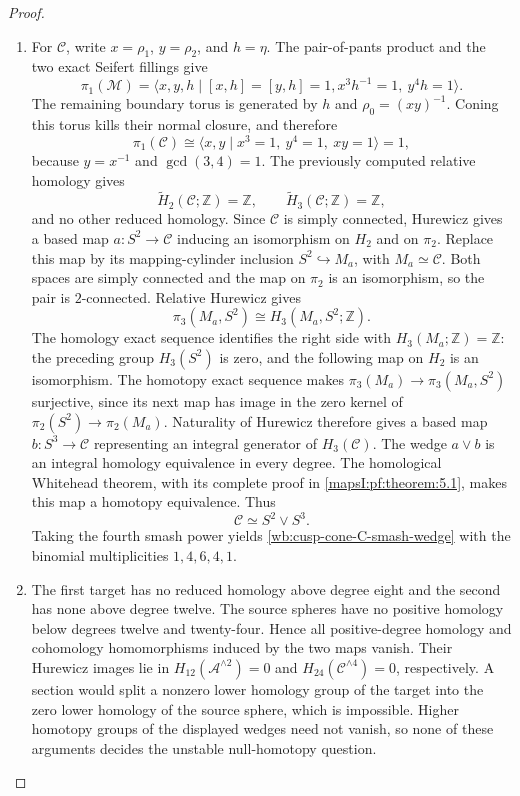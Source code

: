 \begin{proof}
\begin{enumerate}[label=\arabic*.,leftmargin=*]
\item For \(\mathcal C\), write \(x=\rho_1\), \(y=\rho_2\), and
\(h=\eta\).  The pair-of-pants product and the two exact Seifert fillings
give
\[
 \pi_1(\mathcal M)=
 \langle x,y,h\mid[x,h]=[y,h]=1,
 x^3h^{-1}=1,\ y^4h=1\rangle.
\]
The remaining boundary torus is generated by \(h\) and
\(\rho_0=(xy)^{-1}\).  Coning this torus kills their normal closure, and
therefore
\[
 \pi_1(\mathcal C)
 \cong\langle x,y\mid x^3=1,\ y^4=1,\ xy=1\rangle=1,
\]
because \(y=x^{-1}\) and \(\gcd(3,4)=1\).  The previously computed
relative homology gives
\[
 \widetilde H_2(\mathcal C;\mathbb Z)=\mathbb Z,
 \qquad
 \widetilde H_3(\mathcal C;\mathbb Z)=\mathbb Z,
\]
and no other reduced homology.  %
Since \(\mathcal C\) is simply connected, Hurewicz gives a based
map \(a:S^2\to\mathcal C\) inducing an isomorphism on \(H_2\)
and on \(\pi_2\).  Replace this map by its mapping-cylinder
inclusion \(S^2\hookrightarrow M_a\), with
\(M_a\simeq\mathcal C\).  Both spaces are simply connected and
the map on \(\pi_2\) is an isomorphism, so the pair is
\(2\)-connected.  Relative Hurewicz gives
\[
 \pi_3(M_a,S^2)\cong H_3(M_a,S^2;\mathbb Z).
\]
The homology exact sequence identifies the right side with
\(H_3(M_a;\mathbb Z)=\mathbb Z\): the preceding group
\(H_3(S^2)\) is zero, and the following map on \(H_2\) is an
isomorphism.  The homotopy exact sequence makes
\(\pi_3(M_a)\to\pi_3(M_a,S^2)\) surjective, since its next
map has image in the zero kernel of
\(\pi_2(S^2)\to\pi_2(M_a)\).  Naturality of Hurewicz therefore
gives a based map \(b:S^3\to\mathcal C\) representing an integral
generator of \(H_3(\mathcal C)\).  The wedge \(a\vee b\) is an
integral homology equivalence in every degree.  The homological
Whitehead theorem, with its complete proof in
\cref{mapsI:pf:theorem:5.1}, makes this map a homotopy equivalence.  Thus
\[
 \mathcal C\simeq S^2\vee S^3.
\]
Taking the fourth smash power yields \cref{wb:cusp-cone-C-smash-wedge} with
the binomial multiplicities \(1,4,6,4,1\).

\item The first target has no reduced homology above degree eight and the second
has none above degree twelve.  The source spheres have no positive homology
below degrees twelve and twenty-four.  Hence all positive-degree homology
and cohomology homomorphisms induced by the two maps vanish.  Their
Hurewicz images lie in \(H_{12}(\mathcal A^{\wedge2})=0\) and
\(H_{24}(\mathcal C^{\wedge4})=0\), respectively.  A section would split a
nonzero lower homology group of the target into the zero lower homology of
the source sphere, which is impossible.  Higher homotopy groups of the
displayed wedges need not vanish, so none of these arguments decides the
unstable null-homotopy question.
\end{enumerate}
\end{proof}


